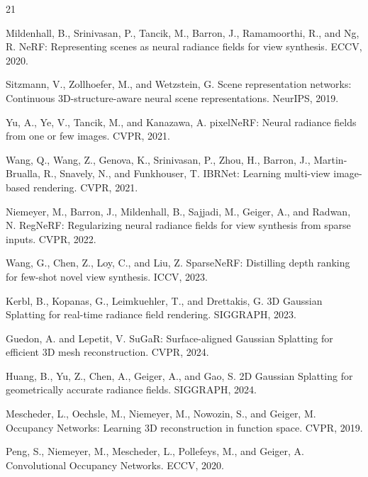 \documentclass{article}
\begin{document}
\begin{thebibliography}{21}

Mildenhall, B., Srinivasan, P., Tancik, M., Barron, J., Ramamoorthi, R., and Ng, R.
NeRF: Representing scenes as neural radiance fields for view synthesis. ECCV, 2020.

Sitzmann, V., Zollhoefer, M., and Wetzstein, G.
Scene representation networks: Continuous 3D-structure-aware neural scene representations. NeurIPS, 2019.

Yu, A., Ye, V., Tancik, M., and Kanazawa, A.
pixelNeRF: Neural radiance fields from one or few images. CVPR, 2021.

Wang, Q., Wang, Z., Genova, K., Srinivasan, P., Zhou, H., Barron, J., Martin-Brualla, R., Snavely, N., and Funkhouser, T.
IBRNet: Learning multi-view image-based rendering. CVPR, 2021.

Niemeyer, M., Barron, J., Mildenhall, B., Sajjadi, M., Geiger, A., and Radwan, N.
RegNeRF: Regularizing neural radiance fields for view synthesis from sparse inputs. CVPR, 2022.

Wang, G., Chen, Z., Loy, C., and Liu, Z.
SparseNeRF: Distilling depth ranking for few-shot novel view synthesis. ICCV, 2023.

Kerbl, B., Kopanas, G., Leimkuehler, T., and Drettakis, G.
3D Gaussian Splatting for real-time radiance field rendering. SIGGRAPH, 2023.

Guedon, A. and Lepetit, V.
SuGaR: Surface-aligned Gaussian Splatting for efficient 3D mesh reconstruction. CVPR, 2024.

Huang, B., Yu, Z., Chen, A., Geiger, A., and Gao, S.
2D Gaussian Splatting for geometrically accurate radiance fields. SIGGRAPH, 2024.

Mescheder, L., Oechsle, M., Niemeyer, M., Nowozin, S., and Geiger, M.
Occupancy Networks: Learning 3D reconstruction in function space. CVPR, 2019.

Peng, S., Niemeyer, M., Mescheder, L., Pollefeys, M., and Geiger, A.
Convolutional Occupancy Networks. ECCV, 2020.


\end{thebibliography}
\end{document}
